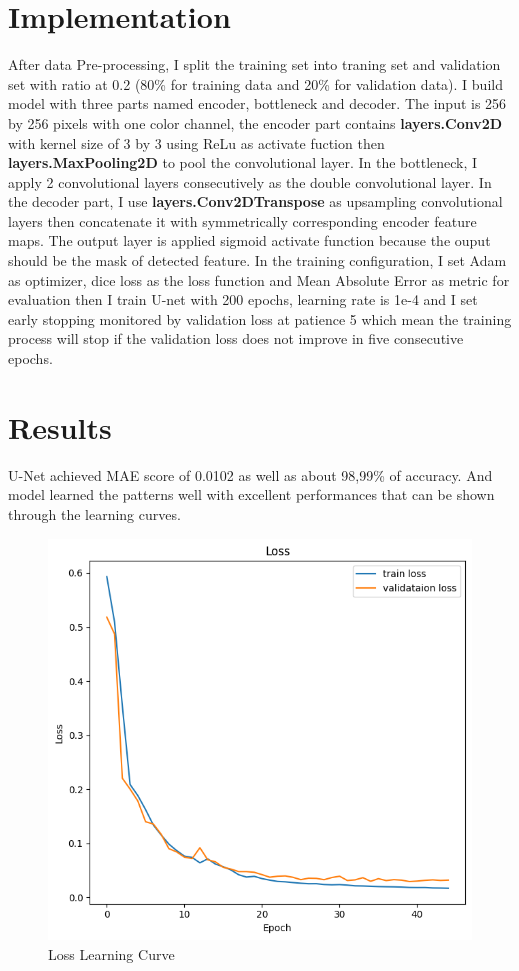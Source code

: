 \documentclass[twocolumn]{article}
\begin{document}
\section{Implementation}
After data Pre-processing, I split the training set into traning set and validation set with ratio at 0.2 (80\% for training data and 20\% for validation data). I build model with three parts named encoder, bottleneck and decoder. The input is 256 by 256 pixels with one color channel, the encoder part contains \textbf{layers.Conv2D} with kernel size of 3 by 3 using ReLu as activate fuction then \textbf{layers.MaxPooling2D} to pool the convolutional layer. In the bottleneck, I apply 2 convolutional layers consecutively as the double convolutional layer. In the decoder part, I use \textbf{layers.Conv2DTranspose} as upsampling convolutional layers then concatenate it with symmetrically corresponding encoder feature maps. The output layer is applied sigmoid activate function because the ouput should be the mask of detected feature. In the training configuration, I set Adam as optimizer, dice loss as the loss function and Mean Absolute Error as metric for evaluation then I train U-net with 200 epochs, learning rate is 1e-4 and I set early stopping monitored by validation loss at patience 5 which mean the training process will stop if the validation loss does not improve in five consecutive epochs.

\section{Results}
U-Net achieved MAE score of 0.0102 as well as about 98,99\% of accuracy.
And model learned the patterns well with excellent performances that can be shown through the learning curves.

\begin{figure}[H]
    \centering
    \includegraphics[width=1\linewidth]{figures/Loss_Learning_Curve.png}
    \caption{Loss Learning Curve}
    \label{fig:enter-label}
\end{figure}
\end{document}
